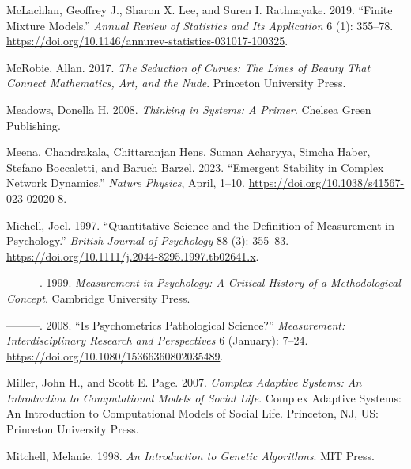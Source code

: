 \documentclass[
  a4paper,
  DIV=11,
  numbers=noendperiod,
  oneside]{scrreprt}
\newlength{\cslhangindent}
\newenvironment{CSLReferences}[2] %
 {\begin{list}{}{%
  \setlength{\itemindent}{0pt}
  \setlength{\leftmargin}{0pt}
  \setlength{\parsep}{0pt}
  \ifodd #1
   \setlength{\leftmargin}{\cslhangindent}
   \setlength{\itemindent}{-1\cslhangindent}
  \fi
  \setlength{\itemsep}{#2\baselineskip}}}
 {\end{list}}
\begin{document}
\begin{CSLReferences}{1}{0}
McLachlan, Geoffrey J., Sharon X. Lee, and Suren I. Rathnayake. 2019.
{``Finite {Mixture Models}.''} \emph{Annual Review of Statistics and Its
Application} 6 (1): 355--78.
\url{https://doi.org/10.1146/annurev-statistics-031017-100325}.

McRobie, Allan. 2017. \emph{The {Seduction} of {Curves}: {The Lines} of
{Beauty That Connect Mathematics}, {Art}, and the {Nude}}. {Princeton
University Press}.

Meadows, Donella H. 2008. \emph{Thinking in {Systems}: {A Primer}}.
{Chelsea Green Publishing}.

Meena, Chandrakala, Chittaranjan Hens, Suman Acharyya, Simcha Haber,
Stefano Boccaletti, and Baruch Barzel. 2023. {``Emergent Stability in
Complex Network Dynamics.''} \emph{Nature Physics}, April, 1--10.
\url{https://doi.org/10.1038/s41567-023-02020-8}.

Michell, Joel. 1997. {``Quantitative Science and the Definition of
Measurement in Psychology.''} \emph{British Journal of Psychology} 88
(3): 355--83. \url{https://doi.org/10.1111/j.2044-8295.1997.tb02641.x}.

---------. 1999. \emph{Measurement in {Psychology}: {A Critical History}
of a {Methodological Concept}}. {Cambridge University Press}.

---------. 2008. {``Is {Psychometrics Pathological Science}?''}
\emph{Measurement: Interdisciplinary Research and Perspectives} 6
(January): 7--24. \url{https://doi.org/10.1080/15366360802035489}.

Miller, John H., and Scott E. Page. 2007. \emph{Complex Adaptive
Systems: {An} Introduction to Computational Models of Social Life}.
Complex Adaptive Systems: {An} Introduction to Computational Models of
Social Life. {Princeton, NJ, US}: {Princeton University Press}.

Mitchell, Melanie. 1998. \emph{An {Introduction} to {Genetic
Algorithms}}. {MIT Press}.


\end{CSLReferences}
\end{document}
